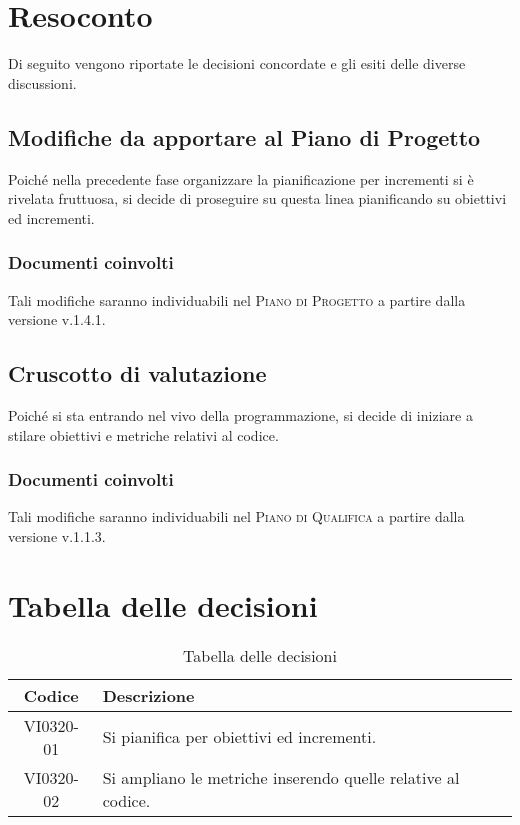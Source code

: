 \documentclass{article}
\begin{document}
\newpage
\section{Resoconto}
\label{sec:resoconto}

Di seguito vengono riportate le decisioni concordate e gli esiti delle diverse discussioni.

\subsection{Modifiche da apportare al Piano di Progetto}
\label{itm:1}

Poiché nella precedente fase organizzare la pianificazione per incrementi si è rivelata fruttuosa, si decide di proseguire su questa linea pianificando su obiettivi ed incrementi.
\subsubsection*{Documenti coinvolti}
Tali modifiche saranno individuabili nel \textsc{Piano di Progetto} a partire dalla versione v.1.4.1.

\subsection{Cruscotto di valutazione}
\label{itm:2}

Poiché si sta entrando nel vivo della programmazione, si decide di iniziare a stilare obiettivi e metriche relativi al codice.
\subsubsection*{Documenti coinvolti}
Tali modifiche saranno individuabili nel \textsc{Piano di Qualifica} a partire dalla versione v.1.1.3.


\newpage
\section{Tabella delle decisioni}%
\label{sub:decisioni}

\begin{table}[!ht]
	\centering
	\begin{tabular}{|c|p{13cm}|}
		\hline
		\rowcolor{lightgray}
		\textbf{Codice} & \textbf{Descrizione} \\
		\hline
			VI0320-01 & Si pianifica per obiettivi ed incrementi. \\
			VI0320-02 & Si ampliano le metriche inserendo quelle relative al codice. \\
		\hline
	\end{tabular}
	\caption{Tabella delle decisioni}
\end{table}
\end{document}
